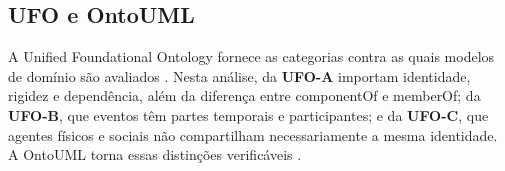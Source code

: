 \subsection{UFO e OntoUML}

A Unified Foundational Ontology fornece as categorias contra as quais modelos de domínio são avaliados \cite{guizzardi2005ontological,guizzardi2022ufo}. Nesta análise, da \textbf{UFO-A} importam identidade, rigidez e dependência, além da diferença entre \guillemotleft{}componentOf\guillemotright{} e \guillemotleft{}memberOf\guillemotright{}; da \textbf{UFO-B}, que eventos têm partes temporais e participantes; e da \textbf{UFO-C}, que agentes físicos e sociais não compartilham necessariamente a mesma identidade. A OntoUML torna essas distinções verificáveis \cite{guizzardi2008grounding,ontouml_readthedocs}.
